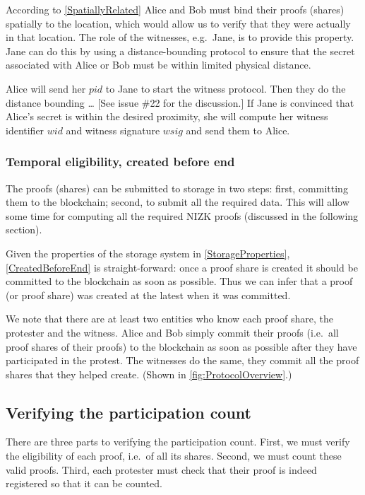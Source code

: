 According to \cref{SpatiallyRelated} Alice and Bob must bind their proofs 
(shares) spatially to the location, which would allow us to verify that they 
were actually in that location.
The role of the witnesses, e.g.\ Jane, is to provide this property.
Jane can do this by using a distance-bounding protocol to ensure that the secret 
associated with Alice or Bob must be within limited physical distance.

Alice will send her \(pid\) to Jane to start the witness protocol.
Then they do the distance bounding \dots
[See issue \#22 for the discussion.]
If Jane is convinced that Alice's secret is within the desired proximity, she 
will compute her witness identifier \(wid\) and witness signature \(wsig\) and 
send them to Alice.

\subsubsection{Temporal eligibility, created before end}

The proofs (shares) can be submitted to storage in two steps:
first, committing them to the blockchain; second, to submit all the required 
data.
This will allow some time for computing all the required \ac{NIZK} proofs 
(discussed in the following section).

Given the properties of the storage system in \cref{StorageProperties}, 
\cref{CreatedBeforeEnd} is straight-forward: once a proof share is created it 
should be committed to the blockchain as soon as possible.
Thus we can infer that a proof (or proof share) was created at the latest when 
it was committed.

We note that there are at least two entities who know each proof share, the 
protester and the witness.
Alice and Bob simply commit their proofs (i.e.\ all proof shares of their 
proofs) to the blockchain as soon as possible after they have participated in 
the protest.
The witnesses do the same, they commit all the proof shares that they helped 
create.
(Shown in \cref{fig:ProtocolOverview}.)

\subsection{Verifying the participation count}

There are three parts to verifying the participation count.
First, we must verify the eligibility of each proof, i.e.\ of all its shares.
Second, we must count these valid proofs.
Third, each protester must check that their proof is indeed registered so that 
it can be counted.

